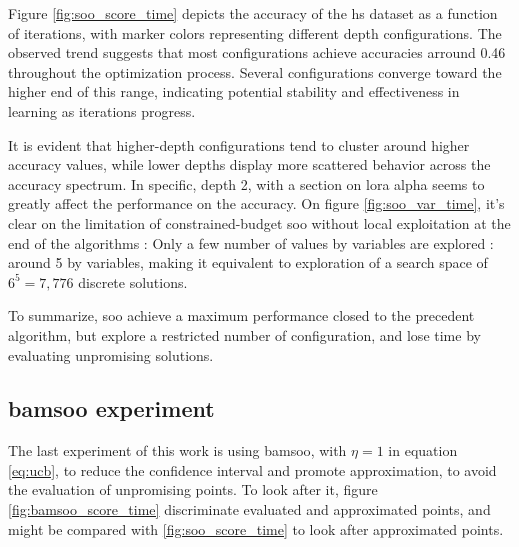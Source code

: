Figure \ref{fig:soo_score_time} depicts the accuracy of the \gls{hs} dataset as a function of iterations, with marker colors representing different depth configurations. The observed trend suggests that most configurations achieve accuracies arround 0.46 throughout the optimization process. Several configurations converge toward the higher end of this range, indicating potential stability and effectiveness in learning as iterations progress. 

It is evident that higher-depth configurations tend to cluster around higher accuracy values, while lower depths display more scattered behavior across the accuracy spectrum. In specific, depth 2, with a section on lora alpha seems to greatly affect the performance on the accuracy. On figure \ref{fig:soo_var_time}, it's clear on the limitation of constrained-budget \acrshort{soo} without local exploitation at the end of the algorithms : Only a few number of values by variables are explored : around 5 by variables, making it equivalent to exploration of a search space of $6^5=7,776$ discrete solutions.

To summarize, \acrshort{soo} achieve a maximum performance closed to the precedent algorithm, but explore a restricted number of configuration, and lose time by evaluating unpromising solutions.

\subsection{\acrshort{bamsoo} experiment}
\label{sec:bamsoo_exp}
The last experiment of this work is using \acrshort{bamsoo}, with $\eta = 1$ in equation \ref{eq:ucb}, to reduce the confidence interval and promote approximation, to avoid the evaluation of unpromising points. To look after it, figure \ref{fig:bamsoo_score_time} discriminate evaluated and approximated points, and might be compared with \ref{fig:soo_score_time} to look after approximated points.



